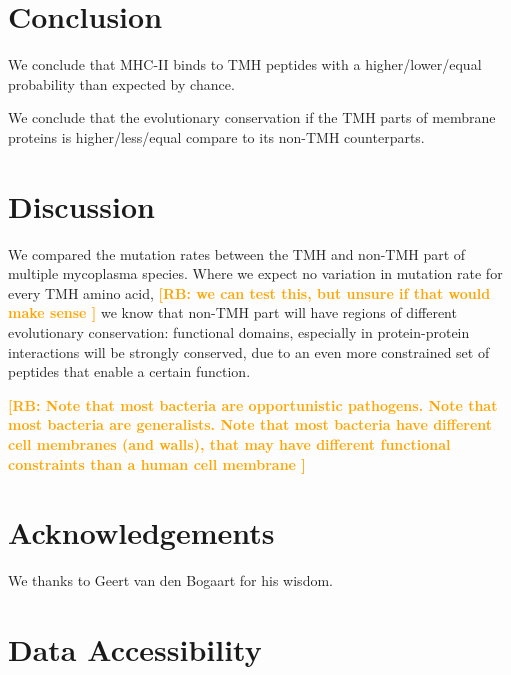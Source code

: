 \documentclass{article}
\newcommand{\richel}[1]{\textcolor{orange}{\textbf{[RB: #1]}}}
\begin{document}
\section{Conclusion}

We conclude that MHC-II binds to TMH peptides with a higher/lower/equal
probability than expected by chance. 

We conclude that the evolutionary conservation if the TMH parts of membrane
proteins is higher/less/equal compare to its non-TMH counterparts.

\section{Discussion}

We compared the mutation rates between the TMH and non-TMH part of
multiple mycoplasma species. Where we expect no variation 
in mutation rate for every TMH amino acid,
\richel{
  we can test this, but unsure if that would make sense
}
we know that non-TMH part will have regions of different evolutionary
conservation: functional domains, especially in protein-protein
interactions will be strongly conserved, due to an even more constrained
set of peptides that enable a certain function.

\richel{
  Note that most bacteria are opportunistic pathogens.
  Note that most bacteria are generalists.
  Note that most bacteria have different cell membranes (and walls), that
  may have different functional constraints than a human cell membrane
}

\section{Acknowledgements}

We thanks to Geert van den Bogaart for his wisdom.

\section{Data Accessibility}
\end{document}
